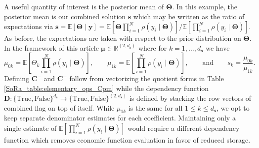 \documentclass[graybox]{svmult}
\begin{document}
A useful quantity of interest is the posterior mean of $\boldsymbol{\Theta}$. In this example, the posterior mean is our combined solution $\boldsymbol{s}$ which may be written as the ratio of expectations via $\boldsymbol{s} = \mathbb{E}\left[\boldsymbol{\Theta} \mid \boldsymbol{y}\right] = \mathbb{E}\left[\boldsymbol{\Theta} \prod_{i=1}^{N} \rho(y_i \mid \boldsymbol{\Theta})\right]/\mathbb{E}\left[\prod_{i=1}^{N} \rho(y_i \mid \boldsymbol{\Theta})\right]$. As before, the expectations are taken with respect to the prior distribution on $\boldsymbol{\Theta}$. In the framework of this article $\boldsymbol{\mu} \in \mathbb{R}^{(2, d_{\boldsymbol{s}})}$ where for $k=1,\dots,d_{\boldsymbol{s}}$ we have 
$$\mu_{0k} = \mathbb{E}\left[\Theta_k \prod_{i=1}^{N} \rho(y_i \mid \boldsymbol{\Theta})\right], \qquad \mu_{1k} = \mathbb{E}\left[\prod_{i=1}^{N} \rho(y_i \mid \boldsymbol{\Theta})\right], \qquad \text{and} \qquad s_k = \frac{\mu_{0k}}{\mu_{1k}}.$$
Defining $\boldsymbol{C}^-$ and $\boldsymbol{C}^+$ follow from vectorizing the quotient forms in Table \ref{SoRa_table:elementary_ops_Cpm} while the dependency function $\boldsymbol{D}: \{\text{True},\text{False}\}^{d_{\boldsymbol{s}}} \to \{\text{True},\text{False}\}^{(2, d_{\boldsymbol{s}})}$ is defined by stacking the row vectors of combined flag on top of itself. While $\mu_{1k}$ is the same for all $1 \leq k \leq d_{\boldsymbol{s}}$, we opt to keep separate denominator estimates for each coefficient. Maintaining only a single estimate of $\mathbb{E}\left[\prod_{i=1}^{N} \rho(y_i \mid \boldsymbol{\Theta})\right]$ would require a different dependency function which removes economic function evaluation in favor of reduced storage. 

\end{document}
